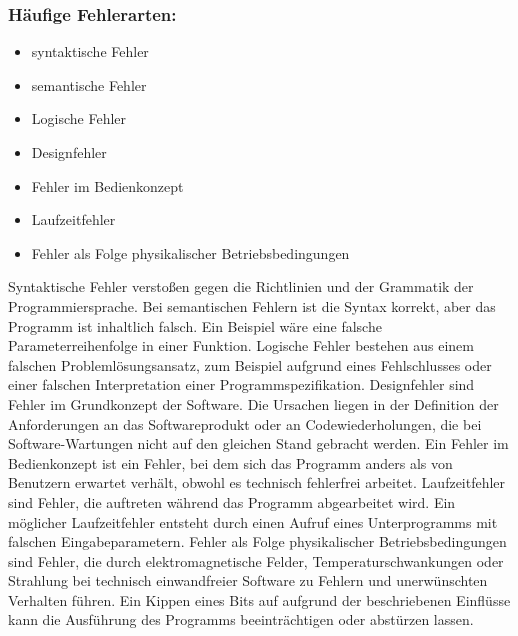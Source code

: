 \documentclass[a4paper,titlepage,halfparskip,12pt]{scrreprt}
\begin{document}
\begin{onehalfspacing}
\smallskip

\subsubsection*{Häufige Fehlerarten:}

\smallskip

\begin{itemize}
\item syntaktische Fehler
\item semantische Fehler
\item Logische Fehler
\item Designfehler
\item Fehler im Bedienkonzept
\item Laufzeitfehler
\item Fehler als Folge physikalischer Betriebsbedingungen
\end{itemize}

Syntaktische Fehler verstoßen gegen die Richtlinien und der Grammatik der Programmiersprache. Bei semantischen Fehlern ist die Syntax korrekt, aber das Programm ist inhaltlich falsch. Ein Beispiel wäre eine falsche Parameterreihenfolge in einer Funktion. Logische Fehler bestehen aus einem falschen Problemlösungsansatz, zum Beispiel aufgrund eines Fehlschlusses oder einer falschen Interpretation einer Programmspezifikation. Designfehler sind Fehler im Grundkonzept der Software. Die Ursachen liegen in der Definition der Anforderungen an das Softwareprodukt oder an Codewiederholungen, die bei Software-Wartungen nicht auf den gleichen Stand gebracht werden. Ein Fehler im Bedienkonzept ist ein Fehler, bei dem sich das Programm anders als von Benutzern erwartet verhält, obwohl es technisch fehlerfrei arbeitet. Laufzeitfehler sind Fehler, die auftreten während das Programm abgearbeitet wird. Ein möglicher Laufzeitfehler entsteht durch einen Aufruf eines Unterprogramms mit falschen Eingabeparametern. Fehler als Folge physikalischer Betriebsbedingungen sind Fehler, die durch elektromagnetische Felder, Temperaturschwankungen oder Strahlung bei technisch einwandfreier Software zu Fehlern und unerwünschten Verhalten führen. Ein Kippen eines Bits auf aufgrund der beschriebenen Einflüsse kann die Ausführung des Programms beeinträchtigen oder abstürzen lassen.\cite{witte2019testmanagement}\\


\end{onehalfspacing}
\end{document}
